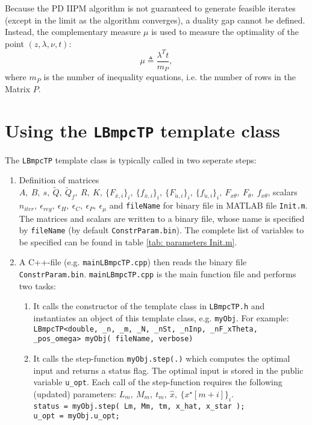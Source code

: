 \documentclass[letter]{article}
\begin{document}
\begin{sffamily}
\noindent
Because the PD IIPM algorithm is not guaranteed to generate feasible iterates (except in the limit as the algorithm converges), a duality gap cannot be defined. Instead, the complementary measure $\mu$ is used to measure the optimality of the point $(z,\lambda,\nu,t)$:
\begin{equation}
\label{eq: dualityGap}
	\mu\triangleq \frac{\lambda^T t}{m_P},
\end{equation}
where $m_P$ is the number of inequality equations, i.e. the number of rows in the Matrix $P$.

\section{Using the \texttt{LBmpcTP} template class}
The \texttt{LBmpcTP} template class is typically called in two seperate steps:

\begin{enumerate}
	\item Definition of matrices $A,\ B,\ s,\ \tilde{Q},\ \tilde{Q}_f,\ R,\ K,\ \{F_{\bar{x},i}\}_i,\ \{f_{\bar{x},i}\}_i,\ \{F_{\check{u},i}\}_i,\ \{f_{\check{u},i}\}_i,\ F_{x\theta},\ F_\theta,\ f_{x\theta}$, scalars $n_{iter},\ \epsilon_{reg},\ \epsilon_H,\ \epsilon_C,\ \epsilon_P,\ \epsilon_\mu$ and \texttt{fileName} for binary file in MATLAB file \texttt{Init.m}. The matrices and scalars are written to a binary file, whose name is specified by \texttt{fileName} (by default \texttt{ConstrParam.bin}). The complete list of variables to be specified can be found in table \ref{tab: parameters Init.m}.
	\item A C++-file (e.g. \texttt{mainLBmpcTP.cpp}) then reads the binary file \texttt{ConstrParam.bin}.  \texttt{mainLBmpcTP.cpp} is the main function file and performs two tasks:
	\begin{enumerate}
		\item It calls the constructor of the template class in \texttt{LBmpcTP.h} and instantiates an object of this template class, e.g. \texttt{myObj}. For example: \\
		\texttt{LBmpcTP<double, \_n, \_m, \_N, \_nSt, \_nInp, \_nF\_xTheta, \_pos\_omega> myObj( fileName, verbose)}
		\item It calls the step-function \texttt{myObj.step(.)} which computes the optimal input and returns a status flag. The optimal input is stored in the public variable \texttt{u\_opt}. Each call of the step-function requires the following (updated) parameters: $L_m,\ M_m,\ t_m,\ \hat{x},\ \{x^\star[m+i]\}_i$. \\
		\texttt{status = myObj.step( Lm, Mm, tm, x\_hat, x\_star );}\\
		\texttt{u\_opt = myObj.u\_opt;}
	\end{enumerate}
\end{enumerate}


\end{sffamily}
\end{document}
